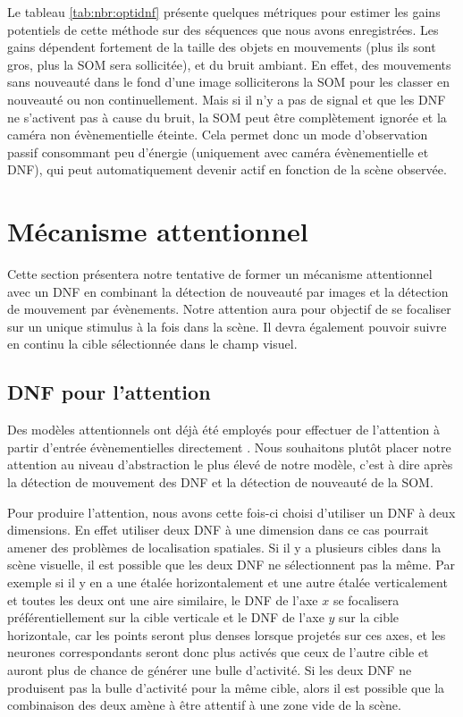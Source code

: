 	Le tableau \ref{tab:nbr:optidnf} présente quelques métriques pour estimer les gains potentiels de cette méthode sur des séquences que nous avons enregistrées. Les gains dépendent fortement de la taille des objets en mouvements (plus ils sont gros, plus la SOM sera sollicitée), et du bruit ambiant. En effet, des mouvements sans nouveauté dans le fond d'une image solliciterons la SOM pour les classer en nouveauté ou non continuellement. Mais si il n'y a pas de signal et que les DNF ne s'activent pas à cause du bruit, la SOM peut être complètement ignorée et la caméra non évènementielle éteinte. Cela permet donc un mode d'observation passif consommant peu d'énergie (uniquement avec caméra évènementielle et DNF), qui peut automatiquement devenir actif en fonction de la scène observée.

	\newpage

	\section{Mécanisme attentionnel}

	Cette section présentera notre tentative de former un mécanisme attentionnel avec un DNF en combinant la détection de nouveauté par images et la détection de mouvement par évènements. Notre attention aura pour objectif de se focaliser sur un unique stimulus à la fois dans la scène. Il devra également pouvoir suivre en continu la cible sélectionnée dans le champ visuel.

	\subsection{DNF pour l'attention}

	Des modèles attentionnels ont déjà été employés pour effectuer de l'attention à partir d'entrée évènementielles directement \cite{evanusa2019event}. Nous souhaitons plutôt placer notre attention au niveau d'abstraction le plus élevé de notre modèle, c'est à dire après la détection de mouvement des DNF et la détection de nouveauté de la SOM.

	Pour produire l'attention, nous avons cette fois-ci choisi d'utiliser un DNF à deux dimensions. En effet utiliser deux DNF à une dimension dans ce cas pourrait amener des problèmes de localisation spatiales. Si il y a plusieurs cibles dans la scène visuelle, il est possible que les deux DNF ne sélectionnent pas la même. Par exemple si il y en a une étalée horizontalement et une autre étalée verticalement et toutes les deux ont une aire similaire, le DNF de l'axe $x$ se focalisera préférentiellement sur la cible verticale et le DNF de l'axe $y$ sur la cible horizontale, car les points seront plus denses lorsque projetés sur ces axes, et les neurones correspondants seront donc plus activés que ceux de l'autre cible et auront plus de chance de générer une bulle d'activité. Si les deux DNF ne produisent pas la bulle d'activité pour la même cible, alors il est possible que la combinaison des deux amène à être attentif à une zone vide de la scène.

